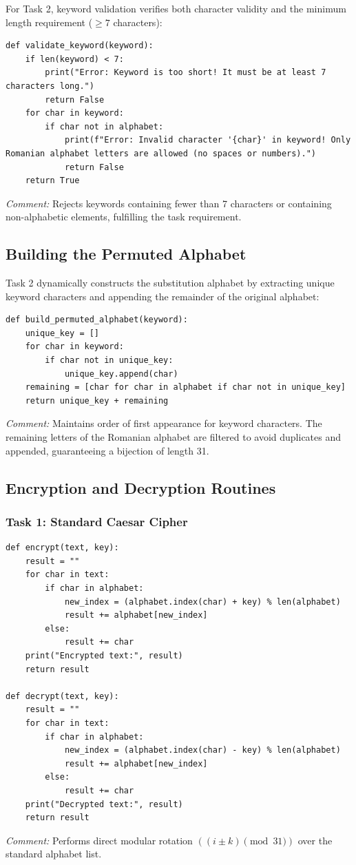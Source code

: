 \documentclass{labreport}
\begin{document}
For Task 2, keyword validation verifies both character validity and the minimum length requirement ($\ge 7$ characters):

\begin{lstlisting}[style=python]
def validate_keyword(keyword):
    if len(keyword) < 7:
        print("Error: Keyword is too short! It must be at least 7 characters long.")
        return False
    for char in keyword:
        if char not in alphabet:
            print(f"Error: Invalid character '{char}' in keyword! Only Romanian alphabet letters are allowed (no spaces or numbers).")
            return False
    return True
\end{lstlisting}
\textit{Comment:} Rejects keywords containing fewer than 7 characters or containing non-alphabetic elements, fulfilling the task requirement.

\subsection{Building the Permuted Alphabet}
Task 2 dynamically constructs the substitution alphabet by extracting unique keyword characters and appending the remainder of the original alphabet:

\begin{lstlisting}[style=python]
def build_permuted_alphabet(keyword):
    unique_key = []
    for char in keyword:
        if char not in unique_key:
            unique_key.append(char)
    remaining = [char for char in alphabet if char not in unique_key]
    return unique_key + remaining
\end{lstlisting}
\textit{Comment:} Maintains order of first appearance for keyword characters. The remaining letters of the Romanian alphabet are filtered to avoid duplicates and appended, guaranteeing a bijection of length 31.

\subsection{Encryption and Decryption Routines}

\subsubsection{Task 1: Standard Caesar Cipher}
\begin{lstlisting}[style=python]
def encrypt(text, key):
    result = ""
    for char in text:
        if char in alphabet:
            new_index = (alphabet.index(char) + key) % len(alphabet)
            result += alphabet[new_index]
        else:
            result += char
    print("Encrypted text:", result)
    return result

def decrypt(text, key):
    result = ""
    for char in text:
        if char in alphabet:
            new_index = (alphabet.index(char) - key) % len(alphabet)
            result += alphabet[new_index]
        else:
            result += char
    print("Decrypted text:", result)
    return result
\end{lstlisting}
\textit{Comment:} Performs direct modular rotation $((i \pm k) \pmod{31})$ over the standard alphabet list.
\end{document}
